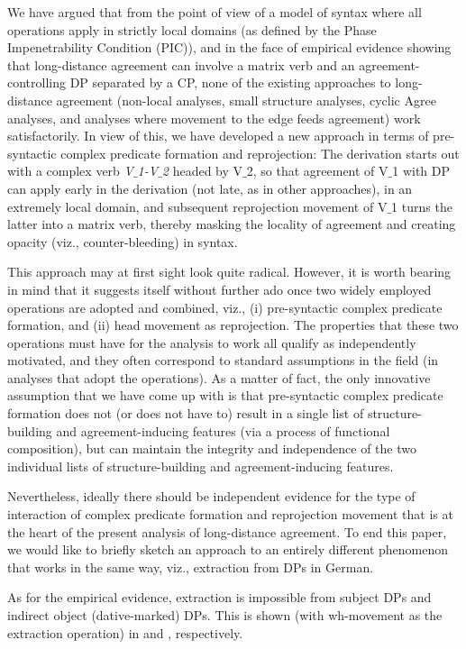\documentclass[output=paper
,modfonts
,nonflat]{langsci/langscibook}
\begin{document}
We have argued that from the point of view of a model of syntax where
all operations apply in strictly local domains (as defined by the
Phase Impenetrability Condition (PIC)), and in the face of empirical
evidence showing that long-distance agreement can involve a matrix
verb and an agreement-controlling DP separated by a CP, none of the
existing approaches to long-distance agreement (non-local analyses,
small structure analyses, cyclic Agree analyses, and analyses where
movement to the edge feeds agreement) work satisfactorily. In view of
this, we have developed a new approach in terms of pre-syntactic
complex predicate formation and reprojection: The derivation starts
out with a complex verb {\it V$\_$1-V$\_$2} headed by V$\_$2, so that agreement
of V$\_$1 with DP can apply early in the derivation (not late, as in
other approaches), in an extremely local domain, and subsequent
reprojection movement of V$\_$1 turns the latter into a matrix verb, thereby
masking the locality of agreement and creating opacity (viz.,
counter-bleeding) in syntax.  

This approach may at first sight look quite radical. However, it is
worth bearing in mind that it suggests itself without further ado once
two widely employed operations are adopted and combined, viz., (i)
pre-syntactic complex predicate formation, and (ii) head movement as
reprojection. The properties that these two operations must have for
the analysis to work all qualify as independently motivated, and they
often correspond to standard assumptions in the field (in analyses
that adopt the operations). As a matter of fact, the only innovative
assumption that we have come up with is that pre-syntactic complex
predicate formation does not (or does not have to) result in a single
list of structure-building and agreement-inducing features (via a
process of functional composition), but can maintain the integrity and
independence of the two individual lists of structure-building and
agreement-inducing features.

Nevertheless, ideally there should be independent evidence for the
type of interaction of complex predicate formation and reprojection
movement that is at the heart of the present analysis of long-distance
agreement. To end this paper, we would like to briefly sketch an
approach to an entirely different phenomenon that works in the same
way, viz., extraction from DPs in German. 

As for the empirical evidence, extraction is impossible from subject
DPs and indirect object (dative-marked) DPs. This is shown (with
wh-movement as the extraction operation) in \Next[a] and \Next[b],
respectively.
\end{document}
